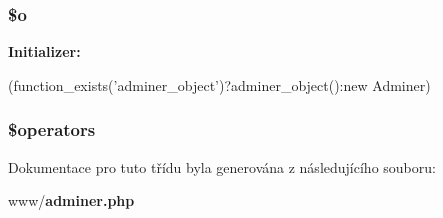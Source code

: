 \subsubsection[{\$o}]{\setlength{\rightskip}{0pt plus 5cm}\$o}\label{dc/d64/class_adminer_ac6c49291f92291a3cece8066d68e5f5e}
{\bfseries Initializer:}
\begin{DoxyCode}
(function_exists('adminer_object')?adminer_object():new
Adminer)
\end{DoxyCode}
\subsubsection[{\$operators}]{\setlength{\rightskip}{0pt plus 5cm}\$operators}\label{dc/d64/class_adminer_a1a526a18e63270ba6814d699637f22bf}


Dokumentace pro tuto třídu byla generována z následujícího souboru:\begin{DoxyCompactItemize}
\item 
www/{\bf adminer.php}\end{DoxyCompactItemize}
